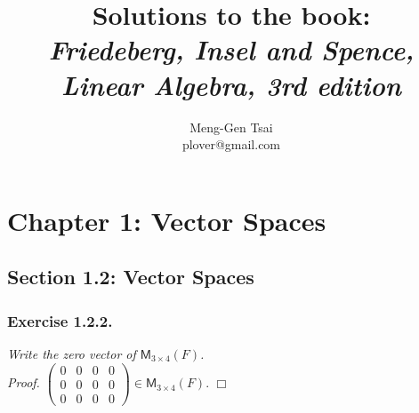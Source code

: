 \documentclass{article}
\title{\textbf{Solutions to the book: \\
\emph{Friedeberg, Insel and Spence, Linear Algebra, 3rd edition}}}
\author{Meng-Gen Tsai \\ plover@gmail.com}
\begin{document}
\maketitle
\tableofcontents












\newpage
\section*{Chapter 1: Vector Spaces \\}



\subsection*{Section 1.2: Vector Spaces \\}



\subsubsection*{Exercise 1.2.2.}
\emph{Write the zero vector of $\mathsf{M}_{3 \times 4}(F)$.} \\



\emph{Proof.}
$\begin{pmatrix}
0 & 0 & 0 & 0 \\
0 & 0 & 0 & 0 \\
0 & 0 & 0 & 0
\end{pmatrix} \in \mathsf{M}_{3 \times 4}(F)$.
$\Box$ \\\\
\end{document}
